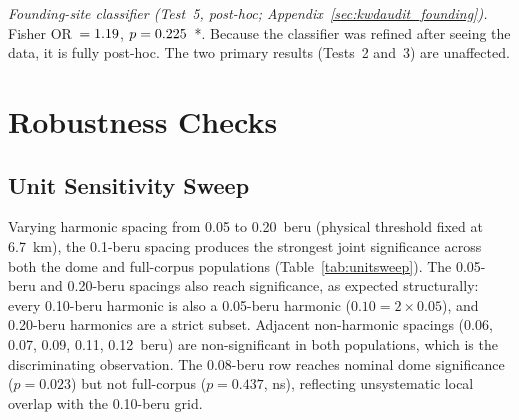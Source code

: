 \documentclass[HARVARD,twocolumn]{USG}
\begin{document}
\noindent\textit{Founding-site classifier (Test~5, post-hoc;
Appendix~\ref{sec:kwdaudit_founding}).}
Fisher OR~$= 1.19$, $p = 0.225$~*.
Because the classifier was refined after seeing the data, it is
fully post-hoc. The two primary results (Tests~2 and~3) are unaffected.

\section{Robustness Checks}
\label{sec:robustness}

\subsection{Unit Sensitivity Sweep}
\label{sec:metrology}

Varying harmonic spacing from 0.05 to 0.20~beru (physical threshold
fixed at 6.7~km), the 0.1-beru spacing produces the strongest joint
significance across both the dome and full-corpus populations
(Table~\ref{tab:unitsweep}). The 0.05-beru and 0.20-beru spacings also
reach significance, as expected structurally: every 0.10-beru harmonic is
also a 0.05-beru harmonic ($0.10 = 2 \times 0.05$), and 0.20-beru harmonics
are a strict subset. Adjacent non-harmonic spacings (0.06, 0.07, 0.09, 0.11,
0.12~beru) are non-significant in both populations, which is the
discriminating observation. The 0.08-beru row reaches nominal
dome significance ($p = 0.023$) but not full-corpus ($p = 0.437$, ns),
reflecting unsystematic local overlap with the 0.10-beru grid.
\end{document}
